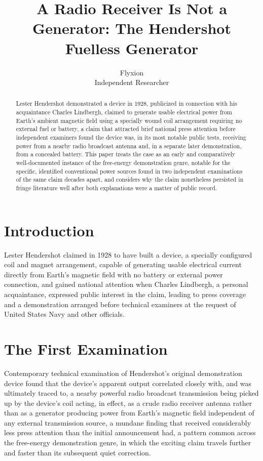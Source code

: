 \documentclass[11pt]{article}
\title{A Radio Receiver Is Not a Generator: The Hendershot Fuelless Generator}
\author{Flyxion \\ \small Independent Researcher}
\date{}
\begin{document}
\maketitle

\begin{abstract}
Lester Hendershot demonstrated a device in 1928, publicized in connection with his acquaintance Charles Lindbergh, claimed to generate usable electrical power from Earth's ambient magnetic field using a specially wound coil arrangement requiring no external fuel or battery, a claim that attracted brief national press attention before independent examiners found the device was, in its most notable public tests, receiving power from a nearby radio broadcast antenna and, in a separate later demonstration, from a concealed battery. This paper treats the case as an early and comparatively well-documented instance of the free-energy demonstration genre, notable for the specific, identified conventional power sources found in two independent examinations of the same claim decades apart, and considers why the claim nonetheless persisted in fringe literature well after both explanations were a matter of public record.
\end{abstract}

\section{Introduction}

Lester Hendershot claimed in 1928 to have built a device, a specially configured coil and magnet arrangement, capable of generating usable electrical current directly from Earth's magnetic field with no battery or external power connection, and gained national attention when Charles Lindbergh, a personal acquaintance, expressed public interest in the claim, leading to press coverage and a demonstration arranged before technical examiners at the request of United States Navy and other officials.

\section{The First Examination}

Contemporary technical examination of Hendershot's original demonstration device found that the device's apparent output correlated closely with, and was ultimately traced to, a nearby powerful radio broadcast transmission being picked up by the device's coil acting, in effect, as a crude radio receiver antenna rather than as a generator producing power from Earth's magnetic field independent of any external transmission source, a mundane finding that received considerably less press attention than the initial announcement had, a pattern common across the free-energy demonstration genre, in which the exciting claim travels further and faster than its subsequent quiet correction.
\end{document}

